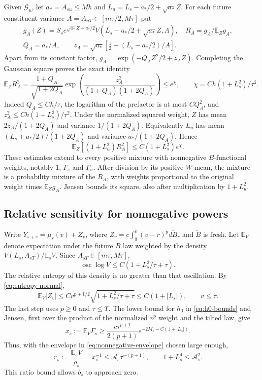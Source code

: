\documentclass[11pt,a4paper]{amsart}
\theoremstyle{plain}
\theoremstyle{definition}
\theoremstyle{remark}
\newcommand{\EE}{\mathbb{E}}
\newcommand{\G}{\mathcal G}
\newcommand{\Es}{\EE_s}
\begin{document}
Given $\G_u$, let $a_*=A_{su}\le Mh$ and $L_u=L_s-a_*/2+\sqrt{a_*}Z$. For each future constituent variance $A=A_{uT}\in[m\tau/2,M\tau]$ put
\begin{equation}\label{eq:mixture-normalization}
 \begin{gathered}
 g_A(Z)=S_s e^{\sqrt{a_*}Z-a_*/2}V(L_s-a_*/2+\sqrt{a_*}Z,A),
 \quad R_A=g_A/\EE_Zg_A,\\
 Q_A=a_*/A,\qquad
 z_A=\sqrt{a_*}\left[\tfrac12-(L_s-a_*/2)/A\right].
 \end{gathered}
\end{equation}
Apart from its constant factor, $g_A=\exp(-Q_AZ^2/2+z_AZ)$. Completing the Gaussian square proves the exact identity
\begin{equation}\label{eq:mixture-second}
 \EE_ZR_A^2=\frac{1+Q_A}{\sqrt{1+2Q_A}}
 \exp\left(\frac{z_A^2}{(1+Q_A)(1+2Q_A)}\right)
 \le e^\chi,
 \qquad \chi=C h(1+L_s^2)/\tau^2.
\end{equation}
Indeed $Q_A\le Ch/\tau$, the logarithm of the prefactor is at most $CQ_A^2$, and $z_A^2\le Ch(1+L_s^2)/\tau^2$. Under the normalized squared weight, $Z$ has mean $2z_A/(1+2Q_A)$ and variance $1/(1+2Q_A)$. Equivalently $L_u$ has mean $(L_s+a_*/2)/(1+2Q_A)$ and variance $a_* /(1+2Q_A)$. Hence
\begin{equation}\label{eq:mixture-weighted}
 \EE_Z[(1+L_u^2)R_A^2]\le C(1+L_s^2)e^\chi.
\end{equation}
These estimates extend to every positive mixture with nonnegative $B$-functional weights, notably $1$, $\Gamma_s$ and $\Gamma_u$. After division by its positive $W$ mean, the mixture is a probability mixture of the $R_A$, with weights proportional to the original weight times $\EE_Zg_A$. Jensen bounds its square, also after multiplication by $1+L_u^2$.

\subsection{Relative sensitivity for nonnegative powers}
Write $Y_{s+v}=\mu_s(v)+Z_v$, where $Z_v=c\int_0^v(v-r)^p d\widetilde B_r$ and $\widetilde B$ is fresh. Let $\EE_V$ denote expectation under the future $B$ law weighted by the density $V(L_s,A_{sT})/\Es V$. Since $A_{sT}\in[m\tau,M\tau]$,
\[
 \operatorname{osc}\log V\le C(1+L_s^2/\tau+\tau).
\]
The relative entropy of this density is no greater than that oscillation. By \eqref{eq:entropy-normal},
\begin{equation}\label{eq:nonnegative-tilted-innovation}
 \EE_V|Z_v|\le C v^{p+1/2}\sqrt{1+L_s^2/\tau+\tau}
 \le C(1+|L_s|),\qquad v\le\tau.
\end{equation}
The last step uses $p\ge0$ and $\tau\le T$. The lower bound for $h_0$ in \eqref{eq:h0-bounds} and Jensen, first over the product of the normalized $v^p$ weight and the tilted law, give
\[
 x_s:=\EE_V\Gamma_s\ge
 \frac{c\tau^{p+1}}{2(p+1)}
 e^{-2M_s-C(1+|L_s|)}.
\]
Thus, with the envelope in \eqref{eq:nonnegative-envelope} chosen large enough,
\begin{equation}\label{eq:nonnegative-relative}
 r_s:=\frac{\Es V}{\rho_s}=x_s^{-1}\le\mathcal A_s\tau^{-(p+1)},
 \qquad 1+L_s^4\le\mathcal A_s^2.
\end{equation}
This ratio bound allows $b_s$ to approach zero.
\end{document}
